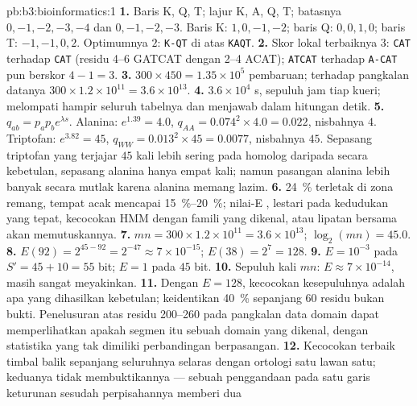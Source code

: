 \begin{solution}{pb:b3:bioinformatics:1}
\textbf{1.} Baris K, Q, T; lajur K, A, Q, T; batasnya $0,-1,-2,-3,-4$
dan $0,-1,-2,-3$. Baris K: $1, 0, -1, -2$; baris Q: $0, 0, 1, 0$; baris T:
$-1, -1, 0, 2$. Optimumnya $2$: \texttt{K-QT} di atas \texttt{KAQT}.
\textbf{2.} Skor lokal terbaiknya $3$: \texttt{CAT} terhadap \texttt{CAT}
(residu 4--6 GATCAT dengan 2--4 ACAT); \texttt{ATCAT} terhadap
\texttt{A-CAT} pun berskor $4 - 1 = 3$.
\textbf{3.} $300\times 450 = 1.35\times 10^{5}$ pembaruan; terhadap
pangkalan datanya $300\times 1.2\times 10^{11} = 3.6\times 10^{13}$.
\textbf{4.} $3.6\times 10^{4}$ s, sepuluh jam tiap kueri;  
melompati hampir seluruh tabelnya dan menjawab dalam hitungan detik.
\textbf{5.} $q_{ab} = p_{a}p_{b}e^{\lambda s}$. Alanina: $e^{1.39} = 4.0$,
$q_{AA} = 0.074^{2}\times 4.0 = 0.022$, nisbahnya $4$. Triptofan:
$e^{3.82} = 45$, $q_{WW} = 0.013^{2}\times 45 = 0.0077$, nisbahnya $45$.
Sepasang triptofan yang terjajar $45$ kali lebih sering pada homolog daripada
secara kebetulan, sepasang alanina hanya empat kali; namun pasangan alanina
lebih banyak secara mutlak karena alanina memang lazim.
\textbf{6.} \qty{24}{\%} terletak di zona remang, tempat 
acak mencapai \qtyrange{15}{20}{\%}; nilai-E ,
 lestari pada kedudukan yang tepat, kecocokan HMM  dengan famili
yang dikenal, atau lipatan bersama akan memutuskannya.
\textbf{7.} $mn = 300\times 1.2\times 10^{11} = 3.6\times 10^{13}$;
$\log_{2}(mn) = 45.0$.
\textbf{8.} $E(92) = 2^{45 - 92} = 2^{-47} \approx 7\times 10^{-15}$;
$E(38) = 2^{7} = 128$.
\textbf{9.} $E = 10^{-3}$ pada $S' = 45 + 10 = 55$ bit; $E = 1$ pada $45$
bit.
\textbf{10.} Sepuluh kali $mn$: $E \approx 7\times 10^{-14}$, masih
sangat meyakinkan.
\textbf{11.} Dengan $E = 128$, kecocokan kesepuluhnya adalah apa yang
dihasilkan kebetulan; keidentikan \qty{40}{\%} sepanjang $60$ residu bukan
bukti. Penelusuran  atas residu 200--260 pada pangkalan data domain
dapat memperlihatkan apakah segmen itu sebuah domain yang dikenal, dengan
statistika yang tak dimiliki perbandingan berpasangan.
\textbf{12.} Kecocokan terbaik timbal balik sepanjang seluruhnya selaras
dengan ortologi satu lawan satu; keduanya tidak membuktikannya --- sebuah
penggandaan pada satu garis keturunan sesudah perpisahannya memberi dua

\end{solution}
